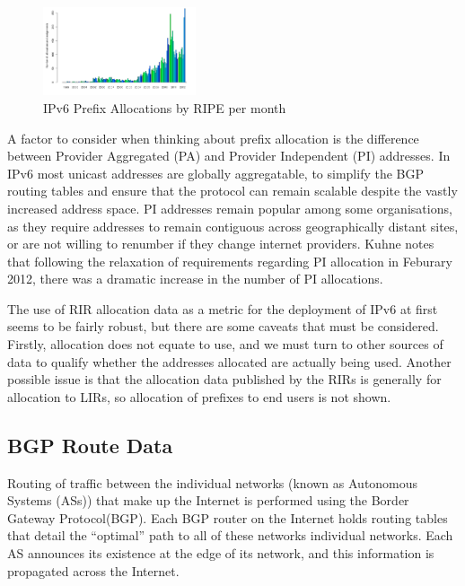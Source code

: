 \begin{figure}[htb]
\centering
\includegraphics[width=0.4\textwidth]{img/v6-alloc-month.png}
\caption{IPv6 Prefix Allocations by RIPE per month}
\label{fig:alloc-month}
\end{figure}

A factor to consider when thinking about prefix allocation is the difference
between Provider Aggregated (PA) and Provider Independent (PI) addresses. In
IPv6 most unicast addresses are globally aggregatable, to simplify the BGP
routing tables and ensure that the protocol can remain scalable despite the
vastly increased address space. PI addresses remain popular among some
organisations, as they require addresses to remain contiguous across
geographically distant sites, or are not willing to renumber if they change
internet providers. Kuhne notes that following the relaxation of requirements
regarding PI allocation in Feburary 2012, there was a dramatic increase in the 
number of PI allocations.

The use of RIR allocation data as a metric for the deployment of IPv6 at first
seems to be fairly robust, but there are some caveats that must be considered.
Firstly, allocation does not equate to use, and we must turn to other sources of
data to qualify whether the addresses allocated are actually being used. Another
possible issue is that the allocation data published by the RIRs is generally
for allocation to LIRs, so allocation of prefixes to end users is not shown.


\subsection{BGP Route Data}

Routing of traffic between the individual networks (known as Autonomous
Systems (ASs)) that make up the Internet is performed using the Border Gateway
Protocol(BGP). Each BGP router on the Internet holds routing tables that
detail the ``optimal'' path to all of these networks individual networks.
Each AS announces its existence at the edge of its network, and this
information is propagated across the Internet.

